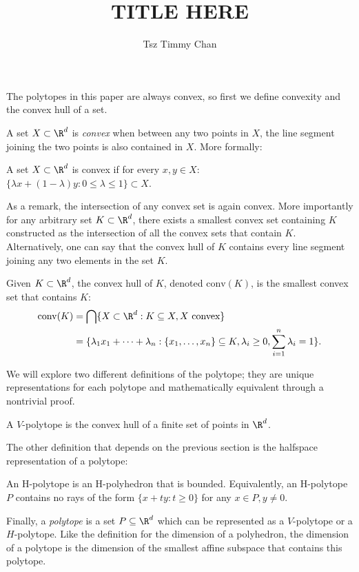\documentclass{TC}
\title{TITLE HERE}	%
\author{Tsz Timmy Chan}	%
\begin{document}
The polytopes in this paper are always convex, so first we define convexity and the convex hull of a set.

A set $X \subset \R^d$ is \emph{convex} when between any two points in $X$, the line segment joining the two points is also contained in $X$. More formally:

\begin{definition}[Convex]
A set $X \subset \R^d$ is convex if for every $x, y \in X$:\\ $\{\lambda x + (1-\lambda)y : 0 \leq \lambda \leq 1\} \subset X$. 
\end{definition}

As a remark, the intersection of any convex set is again convex. More importantly for any arbitrary set $K \subset \R^d$, there exists a smallest convex set containing $K$ constructed as the intersection of all the convex sets that contain $K$. Alternatively, one can say that the convex hull of $K$ contains every line segment joining any two  elements in the set $K$.

\begin{definition}
Given $K \subset \R^d$, the convex hull of $K$, denoted $\mathrm{conv}(K)$, is the smallest convex set that contains $K$:
\begin{align*}
\mathrm{conv}(K) 	&= \bigcap \{X \subset \R^d: K \subseteq X, X \text{ convex}\} \\
					&= \{\lambda_1 x_1 + \cdots + \lambda_n : \{ x_1,\ldots,x_n\} \subseteq K, \lambda_i \geq 0, \sum_{i=1}^n \lambda_i = 1\}.
\end{align*}

\end{definition}

We will explore two different definitions of the polytope; they are unique representations for each polytope and mathematically equivalent through a nontrivial proof. 

\begin{definition}[V-polytope]
A $V$-polytope is the convex hull of a finite set of points in $\R^d$.
\end{definition}

The other definition that depends on the previous section is the halfspace representation of a polytope:

\begin{definition}[H-polytope] An H-polytope is an H-polyhedron that is bounded. Equivalently, an H-polytope $P$ contains no rays of the form $\{x+ty: t \geq 0\}$ for any $x \in P, y \neq 0$. 
\end{definition}

Finally, a \emph{polytope} is a set $P \subseteq \R^d$ which can be represented as a $V$-polytope or a $H$-polytope. Like the definition for the dimension of a polyhedron, the dimension of a polytope is the dimension of the smallest affine subspace that contains this polytope.
\end{document}
